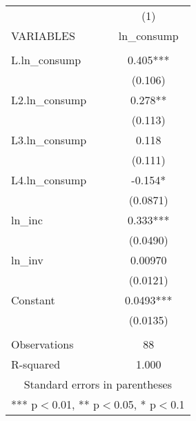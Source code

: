 \begin{tabular}{lc} \hline
 & (1) \\
VARIABLES & ln\_consump \\ \hline
 &  \\
L.ln\_consump & 0.405*** \\
 & (0.106) \\
L2.ln\_consump & 0.278** \\
 & (0.113) \\
L3.ln\_consump & 0.118 \\
 & (0.111) \\
L4.ln\_consump & -0.154* \\
 & (0.0871) \\
ln\_inc & 0.333*** \\
 & (0.0490) \\
ln\_inv & 0.00970 \\
 & (0.0121) \\
Constant & 0.0493*** \\
 & (0.0135) \\
 &  \\
Observations & 88 \\
 R-squared & 1.000 \\ \hline
\multicolumn{2}{c}{ Standard errors in parentheses} \\
\multicolumn{2}{c}{ *** p$<$0.01, ** p$<$0.05, * p$<$0.1} \\
\end{tabular}
